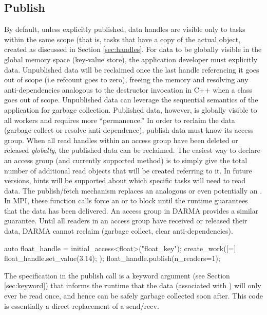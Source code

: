 \subsection{Publish}
\label{subsec:publish}
By default, unless explicitly published, data handles are visible only to tasks
within the same scope (that is, tasks that have a copy of the actual
 object, created as discussed in
Section \ref{sec:handles}.
For data to be globally visible in the global memory space (key-value store),
the application developer must explicitly  data.  
Unpublished data will be reclaimed once the last handle referencing it goes out of scope (i.e refcount goes to zero),
freeing the memory and resolving any anti-dependencies analogous to the
destructor invocation in C++ when a class goes out of scope.  
Unpublished data can leverage the sequential semantics of the application for garbage collection.  
Published data, however, is globally visible to all workers and requires more ``permanence.''  
In order to reclaim the data (garbage collect or resolve anti-dependence), publish data must know its access group.
When all read handles within an access group have been deleted or released \emph{globally}, the published data can be reclaimed.
The easiest way to declare an access group (and currently supported method) is
to simply give the total number of additional read  objects that will be created referring to it.
In future versions, hints will be supported about which specific tasks will need to read data.
The publish/fetch mechanism replaces an analogous  or even potentially an .
In MPI, these function calls force an  or  to block until the runtime guarantees that the data has
been delivered.
An access group in DARMA provides a similar guarantee.
Until all readers in an access group have received or released their data, DARMA cannot reclaim (garbage collect, clear anti-dependencies).

\begin{CppCode}
auto float_handle = initial_access<float>("float_key");
create_work([=]{
  float_handle.set_value(3.14);
});
float_handle.publish(n_readers=1);
\end{CppCode}
The  specification in the publish call is a keyword
argument (see Section \ref{sec:keyword}) that informs the runtime that the data
(associated with ) will only ever be read once, and hence can be safely garbage collected soon after.  
This code is essentially a direct replacement of a send/recv.

